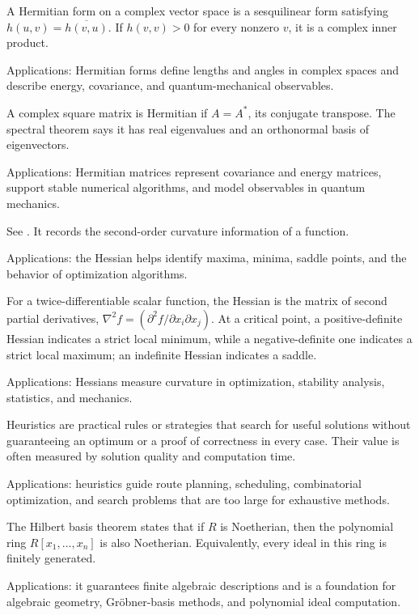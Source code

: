 A Hermitian form on a complex vector space is a sesquilinear form satisfying $h(u,v)=\overline{h(v,u)}$. If $h(v,v)>0$ for every nonzero $v$, it is a complex inner product. \par\noindent Applications: Hermitian forms define lengths and angles in complex spaces and describe energy, covariance, and quantum-mechanical observables.

A complex square matrix is Hermitian if $A=A^*$, its conjugate transpose. The spectral theorem says it has real eigenvalues and an orthonormal basis of eigenvectors. \par\noindent Applications: Hermitian matrices represent covariance and energy matrices, support stable numerical algorithms, and model observables in quantum mechanics.

See . It records the second-order curvature information of a function. \par\noindent Applications: the Hessian helps identify maxima, minima, saddle points, and the behavior of optimization algorithms.

For a twice-differentiable scalar function, the Hessian is the matrix of second partial derivatives, $\nabla^2f=(\partial^2f/\partial x_i\partial x_j)$. At a critical point, a positive-definite Hessian indicates a strict local minimum, while a negative-definite one indicates a strict local maximum; an indefinite Hessian indicates a saddle. \par\noindent Applications: Hessians measure curvature in optimization, stability analysis, statistics, and mechanics.

Heuristics are practical rules or strategies that search for useful solutions without guaranteeing an optimum or a proof of correctness in every case. Their value is often measured by solution quality and computation time. \par\noindent Applications: heuristics guide route planning, scheduling, combinatorial optimization, and search problems that are too large for exhaustive methods.

The Hilbert basis theorem states that if $R$ is Noetherian, then the polynomial ring $R[x_1,\ldots,x_n]$ is also Noetherian. Equivalently, every ideal in this ring is finitely generated. \par\noindent Applications: it guarantees finite algebraic descriptions and is a foundation for algebraic geometry, Gröbner-basis methods, and polynomial ideal computation.

